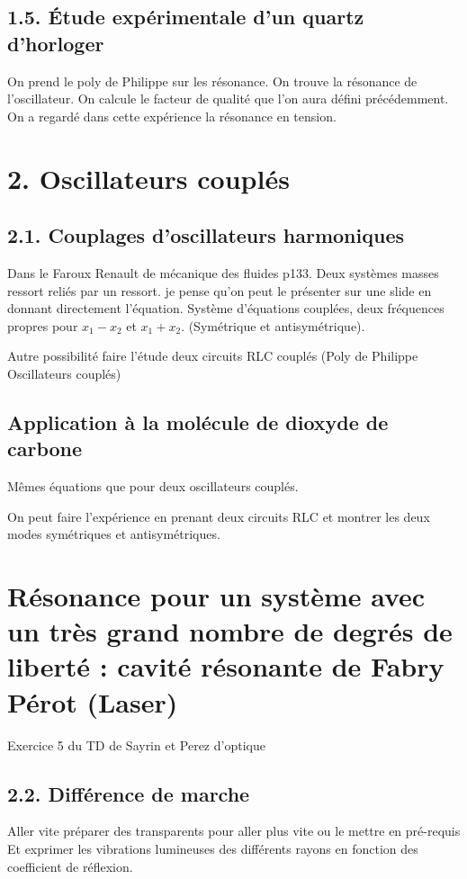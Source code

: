 \documentclass[french, a4paper, 10pt, twocolumn, landscape]{article}
\begin{document}
\subsection*{1.5. Étude expérimentale d'un quartz d'horloger}

On prend le poly de Philippe sur les résonance.  On trouve la résonance de l'oscillateur. On calcule le facteur de qualité que l'on aura défini précédemment. On a regardé dans cette expérience la résonance en tension.

\section*{2. Oscillateurs couplés}
\subsection*{2.1. Couplages d'oscillateurs harmoniques}

Dans le Faroux Renault de mécanique des fluides p133. Deux systèmes masses ressort reliés par un ressort. je pense qu'on peut le présenter sur une slide en donnant directement l'équation. Système d'équations couplées, deux fréquences propres pour $x_1-x_2$ et $x_1+x_2$. (Symétrique et antisymétrique).\medskip

Autre possibilité faire l'étude deux circuits RLC couplés (Poly de Philippe Oscillateurs couplés)

\subsection*{Application à la molécule de dioxyde de carbone}
Mêmes équations que pour deux oscillateurs couplés.\medskip

On peut faire l'expérience en prenant deux circuits RLC et montrer les deux modes symétriques et antisymétriques.

\section*{Résonance pour un système avec un très grand nombre de degrés de liberté : cavité résonante de Fabry Pérot (Laser)}

Exercice 5 du TD de Sayrin et Perez d'optique

\subsection*{2.2. Différence de marche}

Aller vite préparer des transparents pour aller plus vite ou le mettre en pré-requis
Et exprimer les vibrations lumineuses des différents rayons en fonction des coefficient de réflexion.
\end{document}

